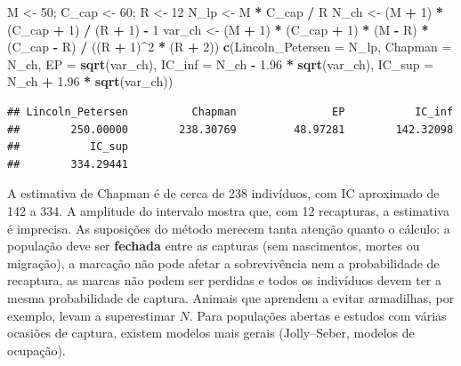 \documentclass[
]{book}
\newenvironment{Shaded}{\begin{snugshade}}{\end{snugshade}}
\newcommand{\AttributeTok}[1]{\textcolor[rgb]{0.13,0.29,0.53}{#1}}
\newcommand{\DecValTok}[1]{\textcolor[rgb]{0.00,0.00,0.81}{#1}}
\newcommand{\FloatTok}[1]{\textcolor[rgb]{0.00,0.00,0.81}{#1}}
\newcommand{\FunctionTok}[1]{\textcolor[rgb]{0.13,0.29,0.53}{\textbf{#1}}}
\newcommand{\NormalTok}[1]{#1}
\newcommand{\OtherTok}[1]{\textcolor[rgb]{0.56,0.35,0.01}{#1}}
\newcommand{\SpecialCharTok}[1]{\textcolor[rgb]{0.81,0.36,0.00}{\textbf{#1}}}
\begin{document}
\begin{Shaded}
\begin{Highlighting}[]
\NormalTok{M }\OtherTok{\textless{}{-}} \DecValTok{50}\NormalTok{; C\_cap }\OtherTok{\textless{}{-}} \DecValTok{60}\NormalTok{; R }\OtherTok{\textless{}{-}} \DecValTok{12}
\NormalTok{N\_lp }\OtherTok{\textless{}{-}}\NormalTok{ M }\SpecialCharTok{*}\NormalTok{ C\_cap }\SpecialCharTok{/}\NormalTok{ R}
\NormalTok{N\_ch }\OtherTok{\textless{}{-}}\NormalTok{ (M }\SpecialCharTok{+} \DecValTok{1}\NormalTok{) }\SpecialCharTok{*}\NormalTok{ (C\_cap }\SpecialCharTok{+} \DecValTok{1}\NormalTok{) }\SpecialCharTok{/}\NormalTok{ (R }\SpecialCharTok{+} \DecValTok{1}\NormalTok{) }\SpecialCharTok{{-}} \DecValTok{1}
\NormalTok{var\_ch }\OtherTok{\textless{}{-}}\NormalTok{ (M }\SpecialCharTok{+} \DecValTok{1}\NormalTok{) }\SpecialCharTok{*}\NormalTok{ (C\_cap }\SpecialCharTok{+} \DecValTok{1}\NormalTok{) }\SpecialCharTok{*}\NormalTok{ (M }\SpecialCharTok{{-}}\NormalTok{ R) }\SpecialCharTok{*}\NormalTok{ (C\_cap }\SpecialCharTok{{-}}\NormalTok{ R) }\SpecialCharTok{/}\NormalTok{ ((R }\SpecialCharTok{+} \DecValTok{1}\NormalTok{)}\SpecialCharTok{\^{}}\DecValTok{2} \SpecialCharTok{*}\NormalTok{ (R }\SpecialCharTok{+} \DecValTok{2}\NormalTok{))}
\FunctionTok{c}\NormalTok{(}\AttributeTok{Lincoln\_Petersen =}\NormalTok{ N\_lp, }\AttributeTok{Chapman =}\NormalTok{ N\_ch, }\AttributeTok{EP =} \FunctionTok{sqrt}\NormalTok{(var\_ch),}
  \AttributeTok{IC\_inf =}\NormalTok{ N\_ch }\SpecialCharTok{{-}} \FloatTok{1.96} \SpecialCharTok{*} \FunctionTok{sqrt}\NormalTok{(var\_ch), }\AttributeTok{IC\_sup =}\NormalTok{ N\_ch }\SpecialCharTok{+} \FloatTok{1.96} \SpecialCharTok{*} \FunctionTok{sqrt}\NormalTok{(var\_ch))}
\end{Highlighting}
\end{Shaded}

\begin{verbatim}
## Lincoln_Petersen          Chapman               EP           IC_inf 
##        250.00000        238.30769         48.97281        142.32098 
##           IC_sup 
##        334.29441
\end{verbatim}

A estimativa de Chapman é de cerca de 238 indivíduos, com IC aproximado de 142 a 334. A amplitude do intervalo mostra que, com 12 recapturas, a estimativa é imprecisa. As suposições do método merecem tanta atenção quanto o cálculo: a população deve ser \textbf{fechada} entre as capturas (sem nascimentos, mortes ou migração), a marcação não pode afetar a sobrevivência nem a probabilidade de recaptura, as marcas não podem ser perdidas e todos os indivíduos devem ter a mesma probabilidade de captura. Animais que aprendem a evitar armadilhas, por exemplo, levam a superestimar \(N\). Para populações abertas e estudos com várias ocasiões de captura, existem modelos mais gerais (Jolly--Seber, modelos de ocupação).
\end{document}

